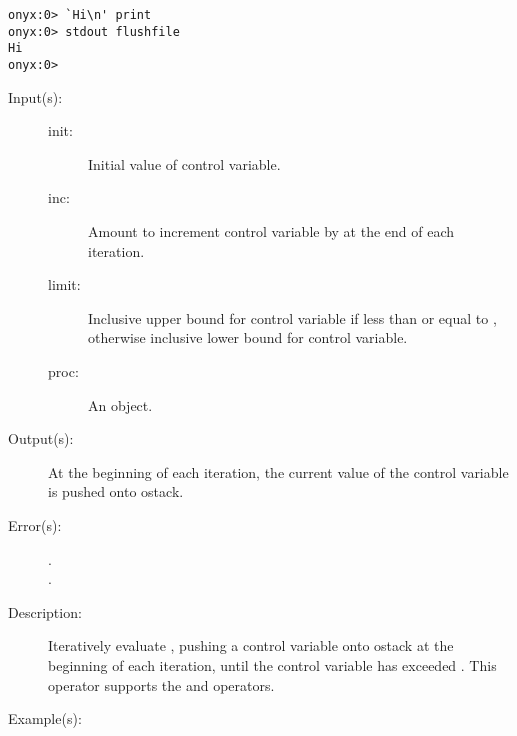 \begin{description}
\begin{description}
\begin{verbatim}
onyx:0> `Hi\n' print
onyx:0> stdout flushfile
Hi
onyx:0>
		\end{verbatim}
	\end{description}
\label{systemdict:for}
\item[{\onyxop{init inc limit proc}{for}{--}}: ]
	\begin{description}\item[]
	\item[Input(s): ]
		\begin{description}\item[]
		\item[init: ]
			Initial value of control variable.
		\item[inc: ]
			Amount to increment control variable by at the end of
			each iteration.
		\item[limit: ]
			Inclusive upper bound for control variable if less than
			or equal to , otherwise inclusive lower
			bound for control variable.
		\item[proc: ]
			An object.
		\end{description}
	\item[Output(s): ]  At the beginning of each iteration, the current
		value of the control variable is pushed onto ostack.
	\item[Error(s): ]
		\begin{description}\item[]
		\item[.]
		\item[.]
		\end{description}
	\item[Description: ]
		Iteratively evaluate , pushing a control variable
		onto ostack at the beginning of each iteration, until the
		control variable has exceeded .  This operator
		supports the
		and operators.
	\item[Example(s): ]\begin{verbatim}


\end{verbatim}
\end{description}
\end{description}
